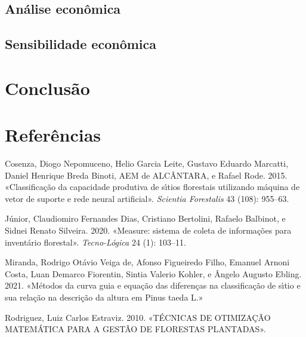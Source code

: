 \documentclass[
  letterpaper,
  DIV=11,
  numbers=noendperiod]{scrartcl}
\newlength{\cslhangindent}
\newlength{\cslentryspacingunit} %
\newenvironment{CSLReferences}[2] %
 {%
  \setlength{\parindent}{0pt}
  \ifodd #1
  \let\oldpar\par
  \def\par{\hangindent=\cslhangindent\oldpar}
  \fi
  \setlength{\parskip}{#2\cslentryspacingunit}
 }%
 {}
\begin{document}
\hypertarget{anuxe1lise-econuxf4mica-1}{%
\subsection{Análise econômica}\label{anuxe1lise-econuxf4mica-1}}

\hypertarget{sensibilidade-econuxf4mica}{%
\subsection{Sensibilidade econômica}\label{sensibilidade-econuxf4mica}}

\hypertarget{conclusuxe3o}{%
\section{Conclusão}\label{conclusuxe3o}}

\hypertarget{referuxeancias}{%
\section{Referências}\label{referuxeancias}}

\hypertarget{refs}{}
\begin{CSLReferences}{1}{0}
\leavevmode{}%
Cosenza, Diogo Nepomuceno, Helio Garcia Leite, Gustavo Eduardo Marcatti,
Daniel Henrique Breda Binoti, AEM de ALCÂNTARA, e Rafael Rode. 2015.
{«Classifica{ç}{ã}o da capacidade produtiva de s{ı́}tios florestais
utilizando m{á}quina de vetor de suporte e rede neural artificial»}.
\emph{Scientia Forestalis} 43 (108): 955--63.

\leavevmode{}%
Júnior, Claudiomiro Fernandes Dias, Cristiano Bertolini, Rafaelo
Balbinot, e Sidnei Renato Silveira. 2020. {«Measure: sistema de coleta
de informa{ç}{õ}es para invent{á}rio florestal»}. \emph{Tecno-L{ó}gica}
24 (1): 103--11.

\leavevmode{}%
Miranda, Rodrigo Otávio Veiga de, Afonso Figueiredo Filho, Emanuel
Arnoni Costa, Luan Demarco Fiorentin, Sintia Valerio Kohler, e Ângelo
Augusto Ebling. 2021. {«M{é}todos da curva guia e equa{ç}{ã}o das
diferen{ç}as na classifica{ç}{ã}o de s{ı́}tio e sua rela{ç}{ã}o na
descri{ç}{ã}o da altura em Pinus taeda L.»}

\leavevmode{}%
Rodriguez, Luiz Carlos Estraviz. 2010. {«T{É}CNICAS DE OTIMIZA{Ç}{Ã}O
MATEM{Á}TICA PARA A GEST{Ã}O DE FLORESTAS PLANTADAS»}.

\end{CSLReferences}
\end{document}
